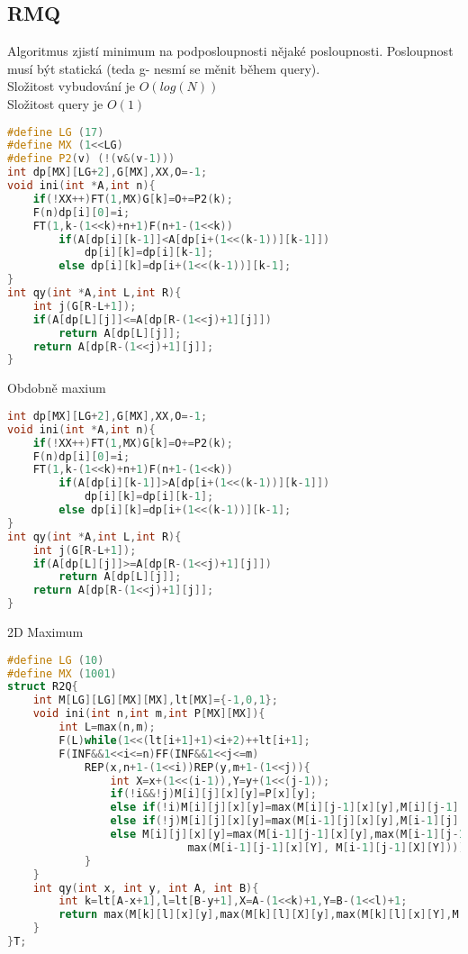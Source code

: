 \documentclass[11pt]{article}
\begin{document}
\subsection{RMQ}
Algoritmus zjistí minimum na podposloupnosti nějaké posloupnosti. Posloupnost musí být statická (teda g- nesmí se měnit během query).
\\Složitost vybudování je $O(log(N))$
\\Složitost query je $O(1)$
\begin{lstlisting}[language=C++]
#define LG (17)
#define MX (1<<LG)
#define P2(v) (!(v&(v-1)))
int dp[MX][LG+2],G[MX],XX,O=-1;
void ini(int *A,int n){
    if(!XX++)FT(1,MX)G[k]=O+=P2(k);
    F(n)dp[i][0]=i;
    FT(1,k-(1<<k)+n+1)F(n+1-(1<<k))
        if(A[dp[i][k-1]]<A[dp[i+(1<<(k-1))][k-1]])
            dp[i][k]=dp[i][k-1];
        else dp[i][k]=dp[i+(1<<(k-1))][k-1];
}
int qy(int *A,int L,int R){
    int j(G[R-L+1]);
    if(A[dp[L][j]]<=A[dp[R-(1<<j)+1][j]])
        return A[dp[L][j]];
    return A[dp[R-(1<<j)+1][j]];
}
\end{lstlisting}
Obdobně maxium
\begin{lstlisting}[language=C++]
int dp[MX][LG+2],G[MX],XX,O=-1;
void ini(int *A,int n){
    if(!XX++)FT(1,MX)G[k]=O+=P2(k);
    F(n)dp[i][0]=i;
    FT(1,k-(1<<k)+n+1)F(n+1-(1<<k))
        if(A[dp[i][k-1]]>A[dp[i+(1<<(k-1))][k-1]])
            dp[i][k]=dp[i][k-1];
        else dp[i][k]=dp[i+(1<<(k-1))][k-1];      
}
int qy(int *A,int L,int R){
    int j(G[R-L+1]);
    if(A[dp[L][j]]>=A[dp[R-(1<<j)+1][j]])
        return A[dp[L][j]];
    return A[dp[R-(1<<j)+1][j]];
}
\end{lstlisting}
2D Maximum
\begin{lstlisting}[language=C++]
#define LG (10)
#define MX (1001)
struct R2Q{
    int M[LG][LG][MX][MX],lt[MX]={-1,0,1};
    void ini(int n,int m,int P[MX][MX]){
        int L=max(n,m);
        F(L)while(1<<(lt[i+1]+1)<i+2)++lt[i+1];
        F(INF&&1<<i<=n)FF(INF&&1<<j<=m)
            REP(x,n+1-(1<<i))REP(y,m+1-(1<<j)){
                int X=x+(1<<(i-1)),Y=y+(1<<(j-1));
                if(!i&&!j)M[i][j][x][y]=P[x][y];
                else if(!i)M[i][j][x][y]=max(M[i][j-1][x][y],M[i][j-1][x][Y]);
                else if(!j)M[i][j][x][y]=max(M[i-1][j][x][y],M[i-1][j][X][y]);
                else M[i][j][x][y]=max(M[i-1][j-1][x][y],max(M[i-1][j-1][X][y],
                            max(M[i-1][j-1][x][Y], M[i-1][j-1][X][Y])));
            }
    }
    int qy(int x, int y, int A, int B){
        int k=lt[A-x+1],l=lt[B-y+1],X=A-(1<<k)+1,Y=B-(1<<l)+1;
        return max(M[k][l][x][y],max(M[k][l][X][y],max(M[k][l][x][Y],M[k][l][X][Y])));
    }
}T;
\end{lstlisting}
\end{document}
